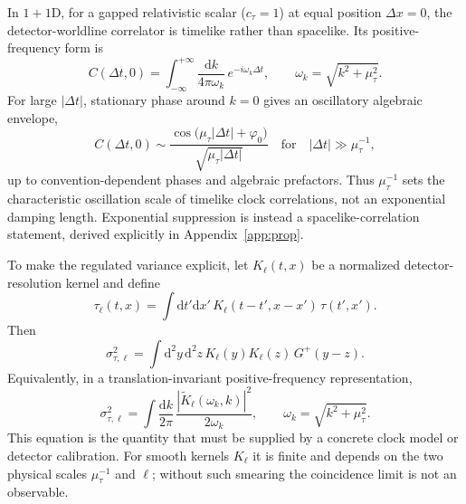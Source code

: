 \documentclass[11pt, a4paper]{article}
\theoremstyle{definition}
\theoremstyle{plain}
\theoremstyle{remark}
\numberwithin{equation}{section}
\newcommand{\dd}{\mathrm{d}}
\begin{document}
        In $1+1$D, for a gapped relativistic scalar ($c_\tau=1$) at equal position $\Delta x=0$, the detector-worldline correlator is timelike rather than spacelike. Its positive-frequency form is
        \begin{equation}
            C(\Delta t,0)
            =
            \int_{-\infty}^{+\infty}\frac{\dd k}{4\pi\omega_k}\,
            e^{-i\omega_k\Delta t},
            \qquad
            \omega_k=\sqrt{k^2+\mu_\tau^2} .
            \label{eq:timelikeCorrelator}
        \end{equation}
        For large $|\Delta t|$, stationary phase around $k=0$ gives an oscillatory algebraic envelope,
        \begin{equation}
            C(\Delta t,0)
            \sim
            \frac{\cos\!\big(\mu_\tau |\Delta t|+\varphi_0\big)}
            {\sqrt{\mu_\tau |\Delta t|}}
            \quad\text{for}\quad |\Delta t|\gg \mu_\tau^{-1},
            \label{eq:CtimelikeAsymptotic}
        \end{equation}
        up to convention-dependent phases and algebraic prefactors. Thus $\mu_\tau^{-1}$ sets the characteristic oscillation scale of timelike clock correlations, not an exponential damping length. Exponential suppression is instead a spacelike-correlation statement, derived explicitly in Appendix~\ref{app:prop}.
        
        To make the regulated variance explicit, let $K_\ell(t,x)$ be a normalized detector-resolution kernel and define
        \begin{equation}
            \tau_\ell(t,x)
            =
            \int \dd t'\dd x'\,K_\ell(t-t',x-x')\,\tau(t',x') .
            \label{eq:tausmear}
        \end{equation}
        Then
        \begin{equation}
            \sigma_{\tau,\ell}^{2}
            =
            \int \dd^2y\,\dd^2z\,
            K_\ell(y)K_\ell(z)\,G^{+}(y-z) .
            \label{eq:regulatedvariance}
        \end{equation}
        Equivalently, in a translation-invariant positive-frequency representation,
        \begin{equation}
            \sigma_{\tau,\ell}^{2}
            =
            \int\frac{\dd k}{2\pi}\,
            \frac{\left|\widetilde K_\ell(\omega_k,k)\right|^2}{2\omega_k},
            \qquad
            \omega_k=\sqrt{k^2+\mu_\tau^2} .
            \label{eq:regulatedvarianceMomentum}
        \end{equation}
        This equation is the quantity that must be supplied by a concrete clock model or detector calibration. For smooth kernels $K_\ell$ it is finite and depends on the two physical scales $\mu_\tau^{-1}$ and $\ell$; without such smearing the coincidence limit is not an observable.
\end{document}

